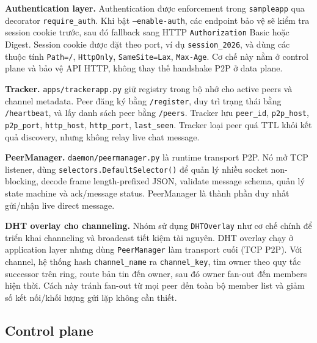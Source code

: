 \textbf{Authentication layer.} Authentication được enforcement trong \texttt{sampleapp} qua decorator \texttt{require\_auth}. Khi bật \texttt{--enable-auth}, các endpoint bảo vệ sẽ kiểm tra session cookie trước, sau đó fallback sang HTTP \texttt{Authorization} Basic hoặc Digest. Session cookie được đặt theo port, ví dụ \texttt{session\_2026}, và dùng các thuộc tính \texttt{Path=/}, \texttt{HttpOnly}, \texttt{SameSite=Lax}, \texttt{Max-Age}. Cơ chế này nằm ở control plane và bảo vệ API HTTP, không thay thế handshake P2P ở data plane.

\textbf{Tracker.} \texttt{apps/trackerapp.py} giữ registry trong bộ nhớ cho active peers và channel metadata. Peer đăng ký bằng \texttt{/register}, duy trì trạng thái bằng \texttt{/heartbeat}, và lấy danh sách peer bằng \texttt{/peers}. Tracker lưu \texttt{peer\_id}, \texttt{p2p\_host}, \texttt{p2p\_port}, \texttt{http\_host}, \texttt{http\_port}, \texttt{last\_seen}. Tracker loại peer quá TTL khỏi kết quả discovery, nhưng không relay live chat message.

\textbf{PeerManager.} \texttt{daemon/peermanager.py} là runtime transport P2P. Nó mở TCP listener, dùng \texttt{selectors.DefaultSelector()} để quản lý nhiều socket non-blocking, decode frame length-prefixed JSON, validate message schema, quản lý state machine và ack/message status. PeerManager là thành phần duy nhất gửi/nhận live direct message.

\textbf{DHT overlay cho channeling.} Nhóm sử dụng \texttt{DHTOverlay} như cơ chế chính để triển khai channeling và broadcast tiết kiệm tài nguyên. DHT overlay chạy ở application layer nhưng dùng \texttt{PeerManager} làm transport cuối (TCP P2P). Với channel, hệ thống hash \texttt{channel\_name} ra \texttt{channel\_key}, tìm owner theo quy tắc successor trên ring, route bản tin đến owner, sau đó owner fan-out đến members hiện thời. Cách này tránh fan-out từ mọi peer đến toàn bộ member list và giảm số kết nối/khối lượng gửi lặp không cần thiết.

\subsection{Control plane}

